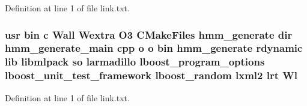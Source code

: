 Definition at line 1 of file link.\-txt.

\subsubsection[{Wl}]{\setlength{\rightskip}{0pt plus 5cm}usr bin c Wall Wextra O3 C\-Make\-Files hmm\-\_\-generate dir hmm\-\_\-generate\-\_\-main cpp o o bin hmm\-\_\-generate rdynamic lib libmlpack so larmadillo lboost\-\_\-program\-\_\-options lboost\-\_\-unit\-\_\-test\-\_\-framework lboost\-\_\-random lxml2 lrt Wl}\label{methods_2hmm_2CMakeFiles_2hmm__generate_8dir_2link_8txt_adebdc1ef9e02457313f3e0e5d942bcd5}


Definition at line 1 of file link.\-txt.

